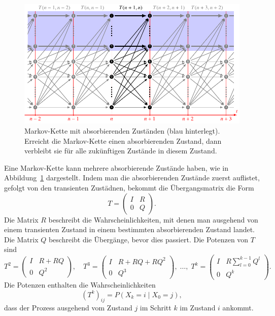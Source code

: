 \begin{figure}
\centering
\includegraphics{chapters/80-wahrscheinlichkeit/images/markov3.pdf}
\caption{Markov-Kette mit absorbierenden Zuständen (blau hinterlegt).
Erreicht die Markov-Kette einen absorbierenden Zustand, dann verbleibt
sie für alle zukünftigen Zustände in diesem Zustand.
\label{buch:wahrscheinlichkeit:fig:abs}}
\end{figure}

Eine Markov-Kette kann mehrere absorbierende Zustände haben, wie in
Abbildung~\ref{buch:wahrscheinlichkeit:fig:abs} dargestellt.
Indem man die absorbierenden Zustände zuerst auflistet, gefolgt von
den transienten Zustädnen, bekommt die Übergangsmatrix die Form
\[
T=
\left(
\begin{array}{c|c}
I&R\\
\hline
0&Q
\end{array}
\right).
\]
Die Matrix $R$ beschreibt die Wahrscheinlichkeiten, mit denen man
ausgehend von einem transienten Zustand
in einem bestimmten absorbierenden Zustand landet.
Die Matrix $Q$ beschreibt die Übergänge, bevor dies passiert.
Die Potenzen von $T$ sind
\begin{equation}
T^2
=
\left(
\begin{array}{c|c}
I&R+RQ \\
\hline
0&Q^2
\end{array}
\right),
\quad
T^3
=
\left(
\begin{array}{c|c}
I&R+RQ+RQ^2 \\
\hline
0&Q^3
\end{array}
\right),
\;
\dots,
\;
T^k
=
\left(
\begin{array}{c|c}
I&\displaystyle R\sum_{l=0}^{k-1} Q^l \\
\hline
0&Q^k
\end{array}
\right).
\label{buch:markov:eqn:Tpowers}
\end{equation}
Die Potenzen enthalten die Wahrscheinlichkeiten
\[
(T^k)_{i\!j}
=
P(X_k=i\mid X_0=j),
\]
dass der Prozess ausgehend vom Zustand $j$ im Schritt $k$ im
Zustand $i$ ankommt.

